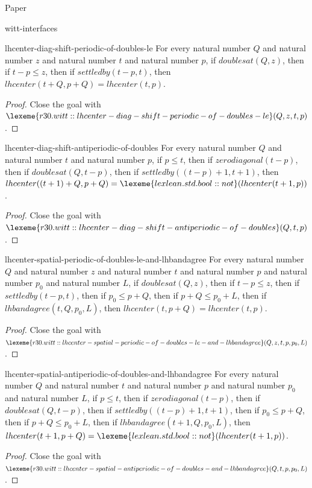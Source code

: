\begin{lexlean}{Paper}
\begin{section}{witt-interfaces}
  \begin{theorem}{lhcenter-diag-shift-periodic-of-doubles-le}
  For every natural number \(Q\) and natural number \(z\) and natural number \(t\) and natural number \(p\), if \(doublesat(Q, z)\), then if \(t - p ≤ z\), then if \(settledby(t - p, t)\), then \(lhcenter(t + Q, p + Q) = lhcenter(t, p)\).
  \begin{proof}
  Close the goal with \(\lexeme{r30.witt::lhcenter-diag-shift-periodic-of-doubles-le}(Q, z, t, p)\).
  \end{proof}
  \end{theorem}

  \begin{theorem}{lhcenter-diag-shift-antiperiodic-of-doubles}
  For every natural number \(Q\) and natural number \(t\) and natural number \(p\), if \(p ≤ t\), then if \(zerodiagonal(t - p)\), then if \(doublesat(Q, t - p)\), then if \(settledby((t - p) + 1, t + 1)\), then \(lhcenter((t + 1) + Q, p + Q) = \lexeme{lexlean.std.bool::not}(lhcenter(t + 1, p))\).
  \begin{proof}
  Close the goal with \(\lexeme{r30.witt::lhcenter-diag-shift-antiperiodic-of-doubles}(Q, t, p)\).
  \end{proof}
  \end{theorem}

  \begin{theorem}{lhcenter-spatial-periodic-of-doubles-le-and-lhbandagree}
  For every natural number \(Q\) and natural number \(z\) and natural number \(t\) and natural number \(p\) and natural number \(p_0\) and natural number \(L\), if \(doublesat(Q, z)\), then if \(t - p ≤ z\), then if \(settledby(t - p, t)\), then if \(p_0 ≤ p + Q\), then if \(p + Q ≤ p_0 + L\), then if \(lhbandagree(t, Q, p_0, L)\), then \(lhcenter(t, p + Q) = lhcenter(t, p)\).
  \begin{proof}
  Close the goal with \(\lexeme{r30.witt::lhcenter-spatial-periodic-of-doubles-le-and-lhbandagree}(Q, z, t, p, p_0, L)\).
  \end{proof}
  \end{theorem}

  \begin{theorem}{lhcenter-spatial-antiperiodic-of-doubles-and-lhbandagree}
  For every natural number \(Q\) and natural number \(t\) and natural number \(p\) and natural number \(p_0\) and natural number \(L\), if \(p ≤ t\), then if \(zerodiagonal(t - p)\), then if \(doublesat(Q, t - p)\), then if \(settledby((t - p) + 1, t + 1)\), then if \(p_0 ≤ p + Q\), then if \(p + Q ≤ p_0 + L\), then if \(lhbandagree(t + 1, Q, p_0, L)\), then \(lhcenter(t + 1, p + Q) = \lexeme{lexlean.std.bool::not}(lhcenter(t + 1, p))\).
  \begin{proof}
  Close the goal with \(\lexeme{r30.witt::lhcenter-spatial-antiperiodic-of-doubles-and-lhbandagree}(Q, t, p, p_0, L)\).
  \end{proof}
  \end{theorem}


\end{section}
\end{lexlean}
